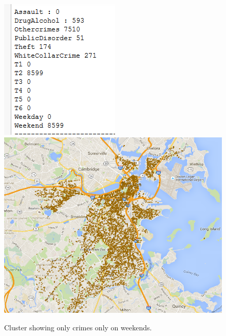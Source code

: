 \documentclass[journal, a4paper]{IEEEtran}
\begin{document}
    \begin{figure}[!hbt]
        \begin{center}
        \includegraphics[width=\columnwidth]{fig4.png}
        \includegraphics[width=\columnwidth]{fig5.png}
        \caption{Cluster showing only crimes only on weekends.}
        \label{fig:tf_plot}
        \end{center}
    \end{figure}
\end{document}
